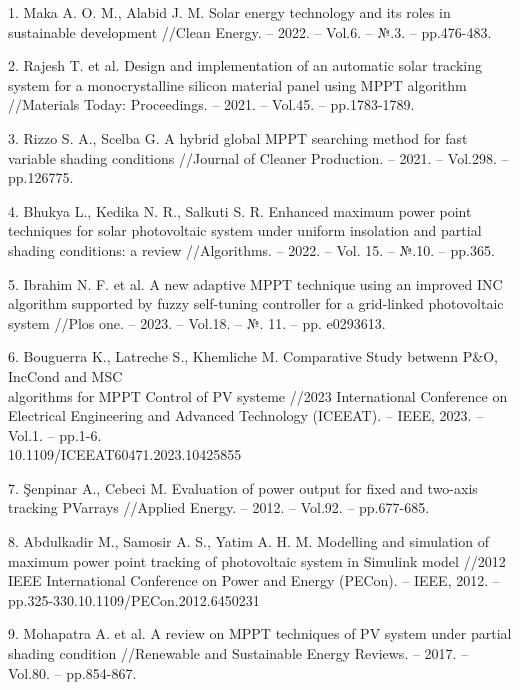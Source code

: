 \begin{references}
1. Maka A. O. M., Alabid J. M. Solar energy technology and its roles in
sustainable development //Clean Energy. -- 2022. -- Vol.6. -- №.3.
-- pp.476-483.
\href{https://doi.org/10.1093/ce/zkac023}{}

2. Rajesh T. et al. Design and implementation of an automatic solar
tracking system for a monocrystalline silicon material panel using
MPPT algorithm //Materials Today: Proceedings. -- 2021. -- Vol.45. --
pp.1783-1789.
\href{https://doi.org/10.1016/j.matpr.2020.08.635}{}

3. Rizzo S. A., Scelba G. A hybrid global MPPT searching method for fast
variable shading conditions //Journal of Cleaner Production. -- 2021.
-- Vol.298. -- pp.126775.
\href{https://doi.org/10.1016/j.jclepro.2021.126775}{}

4. Bhukya L., Kedika N. R., Salkuti S. R. Enhanced maximum power point
techniques for solar photovoltaic system under uniform insolation and
partial shading conditions: a review //Algorithms. -- 2022. -- Vol.
15. -- №.10. -- pp.365.
\href{https://doi.org/10.3390/a15100365}{}

5. Ibrahim N. F. et al. A new adaptive MPPT technique using an improved
INC algorithm supported by fuzzy self-tuning controller for a
grid-linked photovoltaic system //Plos one. -- 2023. -- Vol.18. -- №.
11. -- pp. e0293613.
\href{https://doi.org/10.1371/journal.pone.0293613}{}

6. Bouguerra K., Latreche S., Khemliche M. Comparative Study betwenn
P\&O, IncCond and MSC \\algorithms for MPPT Control of PV systeme
//2023 International Conference on Electrical Engineering and Advanced
Technology (ICEEAT). -- IEEE, 2023. -- Vol.1. -- pp.1-6.\\
10.1109/ICEEAT60471.2023.10425855

7. Şenpinar A., Cebeci M. Evaluation of power output for fixed and
two-axis tracking PVarrays //Applied Energy. -- 2012. -- Vol.92. --
pp.677-685.
\href{https://doi.org/10.1016/j.apenergy.2011.07.043}{}

8. Abdulkadir M., Samosir A. S., Yatim A. H. M. Modelling and simulation
of maximum power point tracking of photovoltaic system in Simulink
model //2012 IEEE International Conference on Power and Energy
(PECon). -- IEEE, 2012. -- pp.325-330.10.1109/PECon.2012.6450231

9. Mohapatra A. et al. A review on MPPT techniques of PV system under
partial shading condition //Renewable and Sustainable Energy Reviews.
-- 2017. -- Vol.80. -- pp.854-867.
\href{https://doi.org/10.1016/j.rser.2017.05.083}{}


\end{references}
